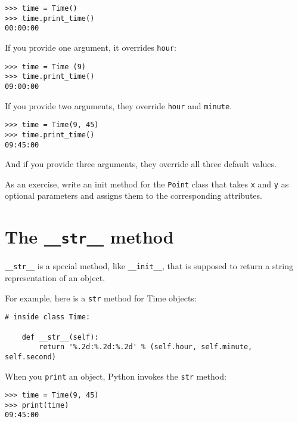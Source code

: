 \begin{lstlisting}
>>> time = Time()
>>> time.print_time()
00:00:00
\end{lstlisting}

%
If you provide one argument, it overrides {\tt hour}:

\begin{lstlisting}
>>> time = Time (9)
>>> time.print_time()
09:00:00
\end{lstlisting}

%
If you provide two arguments, they override {\tt hour} and
{\tt minute}.

\begin{lstlisting}
>>> time = Time(9, 45)
>>> time.print_time()
09:45:00
\end{lstlisting}

%
And if you provide three arguments, they override all three
default values.

As an exercise, write an init method for the {\tt Point} class that takes
{\tt x} and {\tt y} as optional parameters and assigns
them to the corresponding attributes.


\section{The {\tt \_\_str\_\_} method}

\verb"__str__" is a special method, like \verb"__init__",
that is supposed to return a string representation of an object.

For example, here is a {\tt str} method for Time objects:

\begin{lstlisting}
# inside class Time:

    def __str__(self):
        return '%.2d:%.2d:%.2d' % (self.hour, self.minute, self.second)
\end{lstlisting}

%
When you {\tt print} an object, Python invokes the {\tt str} method:

\begin{lstlisting}
>>> time = Time(9, 45)
>>> print(time)
09:45:00
\end{lstlisting}

